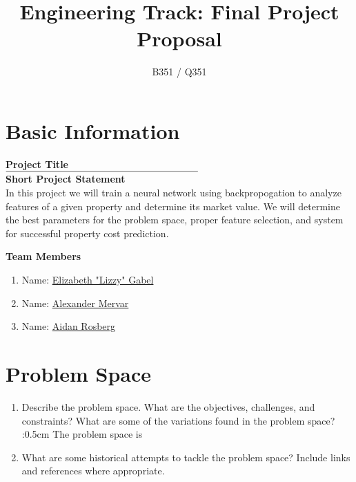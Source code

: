 \documentclass[]{article}
\title{\vspace{-2.5cm}Engineering Track: Final Project Proposal}
\author{B351 / Q351}
\date{}
\begin{document}
\maketitle

\section*{Basic Information}

\begin{multicols}{2}
	
\textbf{Project Title}\\

\vspace{0.25cm}
$\rule{7cm}{0.15mm}$\\

\textbf{Short Project Statement}\\
In this project we will train a neural network using backpropogation to analyze features of a given property and determine its market value.  We will determine the best parameters for the problem space, proper feature selection, and system for successful property cost prediction.

\columnbreak
\textbf{Team Members}
\begin{enumerate}
	
	\vspace{0.5cm}
	\item Name: \underline{Elizabeth "Lizzy" Gabel}
	
	\vspace{1cm}
	\item Name: \underline{Alexander Mervar}
	
	\vspace{1cm}
	\item Name: \underline{Aidan Rosberg}
	
	
\end{enumerate}

\end{multicols}

\section{Problem Space}
\begin{enumerate}
	\item Describe the problem space. What are the objectives, challenges, and constraints? What are some of the variations found in the problem space?
	\vspace:{0.5cm}
	The problem space is 

	\item What are some historical attempts to tackle the problem space? Include links and references where appropriate.
\end{enumerate}
\end{document}
